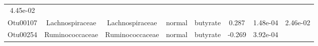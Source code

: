\documentclass[11pt,]{article}
\begin{document}
\begin{longtable}[]{@{}cccccccc@{}}
\begin{minipage}[t]{0.08\columnwidth}
4.45e-02\strut
\end{minipage}\tabularnewline
\begin{minipage}[t]{0.08\columnwidth}\centering\strut
Otu00107\strut
\end{minipage} & \begin{minipage}[t]{0.15\columnwidth}\centering\strut
Lachnospiraceae\strut
\end{minipage} & \begin{minipage}[t]{0.15\columnwidth}\centering\strut
Lachnospiraceae\strut
\end{minipage} & \begin{minipage}[t]{0.08\columnwidth}\centering\strut
normal\strut
\end{minipage} & \begin{minipage}[t]{0.09\columnwidth}\centering\strut
butyrate\strut
\end{minipage} & \begin{minipage}[t]{0.07\columnwidth}\centering\strut
0.287\strut
\end{minipage} & \begin{minipage}[t]{0.08\columnwidth}\centering\strut
1.48e-04\strut
\end{minipage} & \begin{minipage}[t]{0.08\columnwidth}\centering\strut
2.46e-02\strut
\end{minipage}\tabularnewline
\begin{minipage}[t]{0.08\columnwidth}\centering\strut
Otu00254\strut
\end{minipage} & \begin{minipage}[t]{0.15\columnwidth}\centering\strut
Ruminococcaceae\strut
\end{minipage} & \begin{minipage}[t]{0.15\columnwidth}\centering\strut
Ruminococcaceae\strut
\end{minipage} & \begin{minipage}[t]{0.08\columnwidth}\centering\strut
normal\strut
\end{minipage} & \begin{minipage}[t]{0.09\columnwidth}\centering\strut
butyrate\strut
\end{minipage} & \begin{minipage}[t]{0.07\columnwidth}\centering\strut
-0.269\strut
\end{minipage} & \begin{minipage}[t]{0.08\columnwidth}\centering\strut
3.92e-04\strut
\end{minipage} & \begin{minipage}[t]{0.08\columnwidth}\centering\strut

\end{minipage}
\end{longtable}
\end{document}
